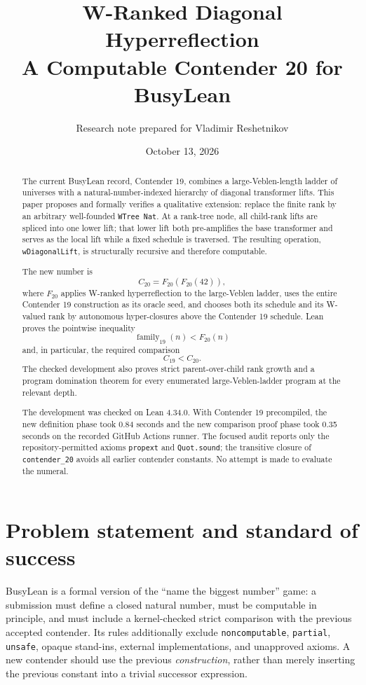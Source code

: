 \documentclass[11pt]{article}
\title{\textbf{W-Ranked Diagonal Hyperreflection}\\
\large A Computable Contender 20 for BusyLean}
\author{Research note prepared for Vladimir Reshetnikov}
\date{October 13, 2026}
\theoremstyle{definition}
\newcommand{\code}[1]{\texttt{#1}}
\newcommand{\Cnineteen}{C_{19}}
\newcommand{\Ctwenty}{C_{20}}
\begin{document}
\maketitle

\begin{abstract}
The current BusyLean record, Contender 19, combines a large-Veblen-length
ladder of universes with a natural-number-indexed hierarchy of diagonal
transformer lifts.  This paper proposes and formally verifies a qualitative
extension: replace the finite rank by an arbitrary well-founded
\code{WTree Nat}.  At a rank-tree node, all child-rank lifts are spliced into
one lower lift; that lower lift both pre-amplifies the base transformer and
serves as the local lift while a fixed schedule is traversed.  The resulting
operation, \code{wDiagonalLift}, is structurally recursive and therefore
computable.

The new number is
\[
  \Ctwenty = F_{20}(F_{20}(42)),
\]
where \(F_{20}\) applies W-ranked hyperreflection to the large-Veblen ladder,
uses the entire Contender 19 construction as its oracle seed, and chooses both
its schedule and its W-valued rank by autonomous hyper-closures above the
Contender 19 schedule.  Lean proves the pointwise inequality
\[
  \operatorname{family}_{19}(n) < F_{20}(n)
\]
and, in particular, the required comparison
\[
  \Cnineteen < \Ctwenty.
\]
The checked development also proves strict parent-over-child rank growth and a
program domination theorem for every enumerated large-Veblen-ladder program at
the relevant depth.

The development was checked on Lean 4.34.0.  With Contender 19 precompiled, the
new definition phase took 0.84 seconds and the new comparison proof phase took
0.35 seconds on the recorded GitHub Actions runner.  The focused audit reports
only the repository-permitted axioms \code{propext} and \code{Quot.sound}; the
transitive closure of \code{contender\_20} avoids all earlier contender
constants.  No attempt is made to evaluate the numeral.
\end{abstract}

\tableofcontents
\newpage

\section{Problem statement and standard of success}

BusyLean is a formal version of the ``name the biggest number'' game: a
submission must define a closed natural number, must be computable in
principle, and must include a kernel-checked strict comparison with the
previous accepted contender.  Its rules additionally exclude
\code{noncomputable}, \code{partial}, \code{unsafe}, opaque stand-ins,
external implementations, and unapproved axioms.  A new contender should use
the previous \emph{construction}, rather than merely inserting the previous
constant into a trivial successor expression.
\end{document}

